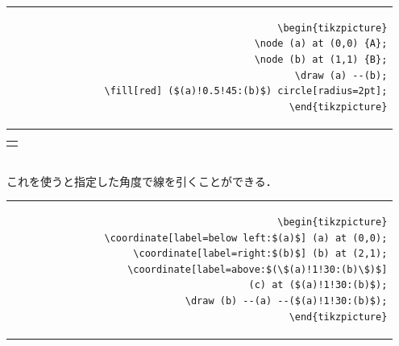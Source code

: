 \documentclass[lualatex]{jlreq}
\begin{document}
\begin{minipage}{0.58 \textwidth}
    \begin{flushright}
        \begin{tabular}{r}
            \begin{lstlisting}[language={[LaTeX] TeX},
            numbers=none,breaklines=true,gobble=12,frame=none]
            \begin{tikzpicture}
                \node (a) at (0,0) {A};
                \node (b) at (1,1) {B};
                \draw (a) --(b);
                \fill[red] ($(a)!0.5!45:(b)$) circle[radius=2pt];
            \end{tikzpicture}
            \end{lstlisting}
        \end{tabular}
    \end{flushright}
\end{minipage}
\hfill
\begin{minipage}{0.34 \textwidth}
    \begin{flushleft}
        \begin{tabular}{l}
            \begin{tikzpicture}
                \node (a) at (0,0) {A};
                \node (b) at (1,1) {B};
                \draw (a) --(b);
                \fill[red] ($(a)!0.5!45:(b)$) circle[radius=2pt];
            \end{tikzpicture}
        \end{tabular}
    \end{flushleft}
\end{minipage}
\\[1em]
これを使うと指定した角度で線を引くことができる．
\\[0.5em]
\begin{minipage}{0.58 \textwidth}
    \begin{flushright}
        \begin{tabular}{r}
            \begin{lstlisting}[language={[LaTeX] TeX},
            numbers=none,breaklines=true,gobble=12,frame=none]
            \begin{tikzpicture}
                \coordinate[label=below left:$(a)$] (a) at (0,0);
                \coordinate[label=right:$(b)$] (b) at (2,1);
                \coordinate[label=above:$(\$(a)!1!30:(b)\$)$]
                    (c) at ($(a)!1!30:(b)$);
                \draw (b) --(a) --($(a)!1!30:(b)$);
            \end{tikzpicture}
            \end{lstlisting}
        \end{tabular}
    \end{flushright}
\end{minipage}
\end{document}
